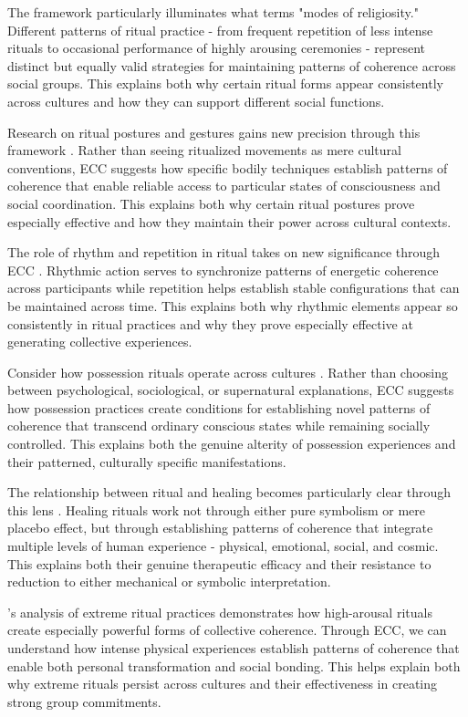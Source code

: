 The framework particularly illuminates what \cite{whitehouse2004modes} terms "modes of religiosity." Different patterns of ritual practice - from frequent repetition of less intense rituals to occasional performance of highly arousing ceremonies - represent distinct but equally valid strategies for maintaining patterns of coherence across social groups. This explains both why certain ritual forms appear consistently across cultures and how they can support different social functions.

Research on ritual postures and gestures gains new precision through this framework \cite{kapferer1997feast}. Rather than seeing ritualized movements as mere cultural conventions, ECC suggests how specific bodily techniques establish patterns of coherence that enable reliable access to particular states of consciousness and social coordination. This explains both why certain ritual postures prove especially effective and how they maintain their power across cultural contexts.

The role of rhythm and repetition in ritual takes on new significance through ECC \cite{mcneill1995keeping}. Rhythmic action serves to synchronize patterns of energetic coherence across participants while repetition helps establish stable configurations that can be maintained across time. This explains both why rhythmic elements appear so consistently in ritual practices and why they prove especially effective at generating collective experiences.

Consider how possession rituals operate across cultures \cite{houseman1998naven}. Rather than choosing between psychological, sociological, or supernatural explanations, ECC suggests how possession practices create conditions for establishing novel patterns of coherence that transcend ordinary conscious states while remaining socially controlled. This explains both the genuine alterity of possession experiences and their patterned, culturally specific manifestations.

The relationship between ritual and healing becomes particularly clear through this lens \cite{kapferer1997feast}. Healing rituals work not through either pure symbolism or mere placebo effect, but through establishing patterns of coherence that integrate multiple levels of human experience - physical, emotional, social, and cosmic. This explains both their genuine therapeutic efficacy and their resistance to reduction to either mechanical or symbolic interpretation.

\cite{xygalatas2013burning}'s analysis of extreme ritual practices demonstrates how high-arousal rituals create especially powerful forms of collective coherence. Through ECC, we can understand how intense physical experiences establish patterns of coherence that enable both personal transformation and social bonding. This helps explain both why extreme rituals persist across cultures and their effectiveness in creating strong group commitments.

